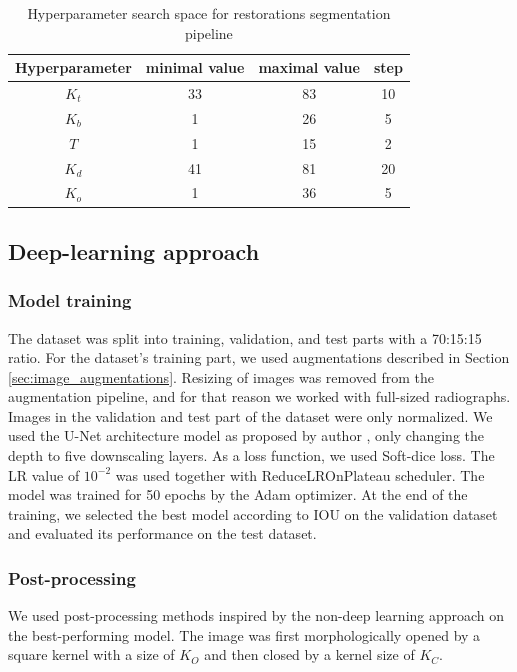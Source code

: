 \begin{table}
    \begin{tabular}{|c|c|c|c|}
        \hline
        Hyperparameter & minimal value & maximal value & step \\ \hline
        $K_t$           & 33            & 83            & 10   \\ \hline
        $K_b$           & 1             & 26            & 5    \\ \hline
        $T$             & 1             & 15            & 2    \\ \hline
        $K_d$           & 41            & 81            & 20   \\ \hline
        $K_o$           & 1             & 36            & 5    \\ \hline
    \end{tabular}
    \caption{Hyperparameter search space for restorations segmentation pipeline}
    \label{tab:hyper_param_segmentation}
\end{table}

\subsection{Deep-learning approach}
\label{sec:methods:seg_unet}
\subsubsection{Model training}
The dataset was split into training, validation, and test parts with a 70:15:15 ratio. For the dataset's training part, we used augmentations described in Section \ref{sec:image_augmentations}. Resizing of images was removed from the augmentation pipeline, and for that reason we worked with full-sized radiographs. Images in the validation and test part of the dataset were only normalized.
We used the U-Net architecture model as proposed by author \cite{Ronneberger2015}, only changing the depth to five downscaling layers. As a loss function, we used Soft-dice loss. The LR value of $10^{-2}$ was used together with ReduceLROnPlateau scheduler. The model was trained for 50 epochs by the Adam optimizer. At the end of the training, we selected the best model according to IOU on the validation dataset and evaluated its performance on the test dataset.

\subsubsection{Post-processing}
\label{sec:segmentation_post_processing}
We used post-processing methods inspired by the non-deep learning approach on the best-performing model. The image was first morphologically opened by a square kernel with a size of $K_O$ and then closed by a kernel size of $K_C$.

